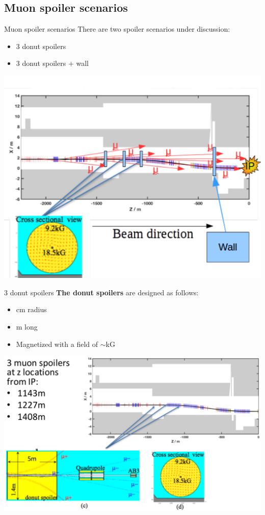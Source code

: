 \documentclass[xcolor={dvipsnames}]{beamer}
\begin{document}
\subsection{Muon spoiler scenarios}
\begin{frame}{Muon spoiler scenarios}
There are two spoiler scenarios under discussion:
\begin{itemize}
 \item 3 donut spoilers
 \item 3 donut spoilers + wall
\end{itemize}
\begin{center}
\includegraphics[height=0.7\textheight]{Muon_spoiler_scenarios.pdf}
\end{center}
\end{frame}

\begin{frame}{3 donut spoilers}
\textbf{The donut spoilers} are designed as follows:
\begin{itemize}
 \item \unit[70]{cm} radius
 \item \unit[5]{m} long
 \item Magnetized  with a field of $\sim$\unit[10-19]{kG}
\end{itemize}
\begin{center}
\includegraphics[height=0.67\textheight]{Muon_spoilers.pdf}
\end{center}
\end{frame}
\end{document}

